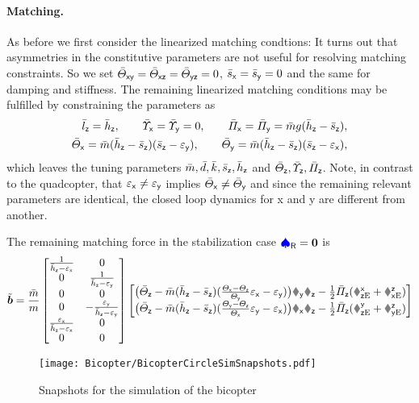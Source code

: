\paragraph{Matching.}
As before we first consider the linearized matching condtions:
It turns out that asymmetries in the constitutive parameters are not useful for resolving matching constraints.
So we set $\bar{\varTheta}_{\mathsf{x}\mathsf{y}}=\bar{\varTheta}_{\mathsf{x}\mathsf{z}}=\bar{\varTheta}_{\mathsf{y}\mathsf{z}}=0$, $\bar{s}_{\mathsf{x}}=\bar{s}_{\mathsf{y}}=0$ and the same for damping and stiffness.
The remaining linearized matching conditions may be fulfilled by constraining the parameters as
\begin{subequations}
\begin{align} 
 \bar{l}_{\mathsf{z}} = \bar{h}_{\mathsf{z}},
\qquad
 \bar{\varUpsilon}_{\mathsf{x}} = \bar{\varUpsilon}_{\mathsf{y}} = 0,
\qquad
 \bar{\varPi}_{\mathsf{x}} = \bar{\varPi}_{\mathsf{y}} = \bar{m} g (\bar{h}_{\mathsf{z}}-\bar{s}_{\mathsf{z}}),
\\
 \bar{\varTheta}_{\mathsf{x}} = \bar{m} (\bar{h}_{\mathsf{z}}-\bar{s}_{\mathsf{z}})(\bar{s}_{\mathsf{z}}-\varepsilon_{\mathsf{y}}),
\qquad
 \bar{\varTheta}_{\mathsf{y}} = \bar{m}(\bar{h}_{\mathsf{z}}-\bar{s}_{\mathsf{z}}) (\bar{s}_{\mathsf{z}}-\varepsilon_{\mathsf{x}}),
\end{align}
\end{subequations}
which leaves the tuning parameters $\bar{m}, \bar{d}, \bar{k}, \bar{s}_{\mathsf{z}}, \bar{h}_{\mathsf{z}}$ and $\bar{\varTheta}_{\mathsf{z}}, \bar{\varUpsilon}_{\mathsf{z}}, \bar{\varPi}_{\mathsf{z}}$.
Note, in contrast to the quadcopter, that $\varepsilon_{\mathsf{x}} \neq \varepsilon_{\mathsf{y}}$ implies $\bar{\varTheta}_{\mathsf{x}} \neq \bar{\varTheta}_{\mathsf{y}}$ and since the remaining relevant parameters are identical, the closed loop dynamics for x and y are different from another.

The remaining matching force in the stabilization case $\boldsymbol{\textcolor{blue}{\spadesuit}}_{\mathsf{R}} = \boldsymbol{0}$ is
\begin{align}
 \tilde{\sysForce} = \frac{\mc}{m}
 \begin{bmatrix} \frac{1}{\hcz-\epsx} & 0 \\ 0 & \frac{1}{\hcz-\epsy} \\ 0 & 0 \\ 0 & -\frac{\epsy}{\hcz-\epsy} \\ \frac{\epsx}{\hcz-\epsx} & 0 \\ 0 & 0 \end{bmatrix}
 \begin{bmatrix}
  \big( \Jcz - \mc(\hcz-\scz) (\tfrac{\Jx-\Jz}{\Jy}\epsx - \epsy) \big) \wy\wz - \tfrac{1}{2} \kapcz (\RExz+\REzx) \\
  \big( \Jcz - \mc(\hcz-\scz) (\tfrac{\Jy-\Jz}{\Jx}\epsy - \epsx) \big) \wx\wz - \tfrac{1}{2} \kapcz (\REyz+\REzy)
 \end{bmatrix}
\end{align}

\begin{figure}
 \centering
 \texttt{[image: Bicopter/BicopterCircleSimSnapshots.pdf]}
 \caption{Snapshots for the simulation of the bicopter}
 \label{fig:BicopterCircleSimSnapshots}
\end{figure}

